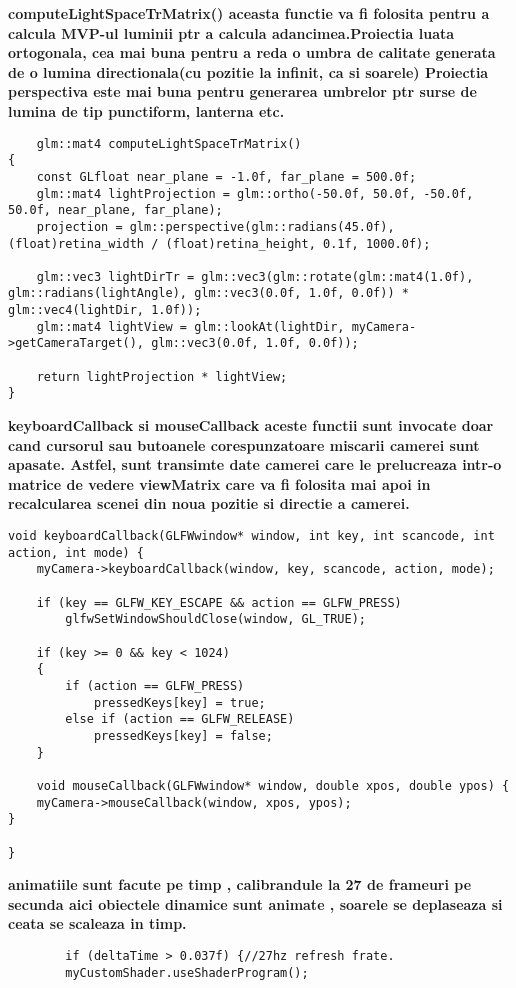 \begin{itemize}
	\tab \tab \bf{computeLightSpaceTrMatrix()} aceasta functie va fi folosita pentru a calcula MVP-ul luminii ptr a calcula adancimea.Proiectia luata ortogonala, cea mai buna pentru a reda o umbra de calitate generata de o lumina directionala(cu pozitie la infinit, ca si soarele) Proiectia perspectiva este mai buna pentru generarea umbrelor ptr surse de lumina de tip punctiform, lanterna etc.\\
	\begin{verbatim}
	glm::mat4 computeLightSpaceTrMatrix()
{
	const GLfloat near_plane = -1.0f, far_plane = 500.0f;
	glm::mat4 lightProjection = glm::ortho(-50.0f, 50.0f, -50.0f, 50.0f, near_plane, far_plane);
	projection = glm::perspective(glm::radians(45.0f), (float)retina_width / (float)retina_height, 0.1f, 1000.0f);

	glm::vec3 lightDirTr = glm::vec3(glm::rotate(glm::mat4(1.0f), glm::radians(lightAngle), glm::vec3(0.0f, 1.0f, 0.0f)) * glm::vec4(lightDir, 1.0f));
	glm::mat4 lightView = glm::lookAt(lightDir, myCamera->getCameraTarget(), glm::vec3(0.0f, 1.0f, 0.0f));

	return lightProjection * lightView;
}
	\end{verbatim}

	\tab \tab \bf{keyboardCallback si mouseCallback} aceste functii sunt invocate doar cand cursorul sau butoanele corespunzatoare miscarii camerei sunt apasate. Astfel, sunt transimte date camerei care le prelucreaza intr-o matrice de vedere viewMatrix care va fi folosita mai apoi in recalcularea scenei din noua pozitie si directie a camerei.\\

	\begin{verbatim}
void keyboardCallback(GLFWwindow* window, int key, int scancode, int action, int mode) {
	myCamera->keyboardCallback(window, key, scancode, action, mode);

	if (key == GLFW_KEY_ESCAPE && action == GLFW_PRESS)
		glfwSetWindowShouldClose(window, GL_TRUE);

	if (key >= 0 && key < 1024)
	{
		if (action == GLFW_PRESS)
			pressedKeys[key] = true;
		else if (action == GLFW_RELEASE)
			pressedKeys[key] = false;
	}

	void mouseCallback(GLFWwindow* window, double xpos, double ypos) {
	myCamera->mouseCallback(window, xpos, ypos);
}
	
}
\end{verbatim}
	\tab \tab \bf{animatiile sunt facute pe timp} , calibrandule la 27 de frameuri pe secunda aici obiectele dinamice sunt animate , soarele se deplaseaza si ceata se scaleaza in timp.\\
	\begin{verbatim}
		if (deltaTime > 0.037f) {//27hz refresh frate.
		myCustomShader.useShaderProgram();
		


\end{verbatim}
\end{itemize}
